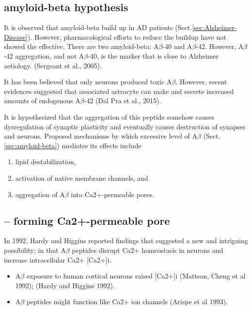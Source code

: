 \subsection{amyloid-beta hypothesis}
\label{sec:amyloid-beta-Alzheimer}

It is observed that amyloid-beta build up in AD patients
(Sect.\ref{sec:Alzheimer-Disease}). However, pharmacological efforts to reduce
the buildup have not showed the effective.
There are two amyloid-beta: A$\beta$-40 and A$\beta$-42. However,
A$\beta$-42 aggregation, and not A$\beta$-40, is the marker that is close to
Alzheimer aetiology. (Sergeant et al., 2005).

It has been believed that only neurons produced toxic A$\beta$.
However, recent evidences suggested that  associated astrocyte can make
and secrete increased amounts of endogenous A$\beta$-42 (Dal Pra et al., 2015).

It is hypothesized that the aggregation of this peptide somehow causes
dysregulation of synaptic plasticity and eventually causes destruction of
synapses and neurons. Proposed mechanisms by which excessive level of A$\beta$
(Sect.\ref{sec:amyloid-beta}) mediates its effects include
\begin{enumerate}
  \item lipid destabilization, 
  
  \item activation of native membrane channels, and
  
  \item aggregation of A$\beta$ into Ca2+-permeable pores.
\end{enumerate}

\subsection{-- forming Ca2+-permeable pore}

In 1992, Hardy and Higgins reported findings that suggested a new and intriguing
possibility; in that A$\beta$ peptides disrupt Ca2+ homeostasis in neurons and
increase intracellular Ca2+ [Ca2+]i.
\begin{itemize}
  \item  A$\beta$ exposure to human cortical neurons raised [Ca2+]i (Mattson, Cheng et
  al 1992); (Hardy and Higgins 1992).
  
  \item A$\beta$ peptides might function like Ca2+ ion channels (Arispe et al 1993). 
\end{itemize}


